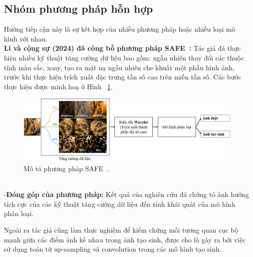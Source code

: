 \subsection{Nhóm phương pháp hỗn hợp}
Hướng tiếp cận này là sự kết hợp của nhiều phương pháp hoặc nhiều loại mô hình với nhau.\\
%
\textbf{Li và cộng sự (2024) đã công bố phương pháp SAFE~\cite{li2024improving}:}
%
Tác giả đã thực hiện nhiều kỹ thuật tăng cường dữ liệu bao gồm: ngẫu nhiên thay đổi các thuộc tính màu sắc, xoay, tạo ra mặt nạ ngẫu nhiên che khuất một phần hình ảnh, trước khi thực hiện trích xuất đặc trưng tần số cao trên miền tần số. Các bước thực hiện được minh hoạ ở Hình ~\ref{fig:model-SAFE-1}. 
%	
\begin{figure}[ht]
	\centering
	\includegraphics[width=1.0\linewidth]{Images/model-SAFE-1.png}	\begin{minipage}{0.9\linewidth}
		\caption{Mô tả phương pháp SAFE~\cite{li2024improving}.}
		\label{fig:model-SAFE-1}
	\end{minipage}
\end{figure}\\
%
%
%
-\textbf{Đóng góp của phương pháp:}
%
Kết quả của nghiên cứu đã chứng tỏ ảnh hưởng tích cực của các kỹ thuật tăng cường dữ liệu đến tính khái quát của mô hình phân loại.

Ngoài ra tác giả cũng làm thực nghiệm để kiểm chứng mối tương quan cục bộ mạnh giữa các điểm ảnh kề nhau trong ảnh tạo sinh, được cho là gây ra bởi việc sử dụng toán tử \gls{up-sampling} và \gls{convolution} trong các mô hình tạo sinh.
%

%






